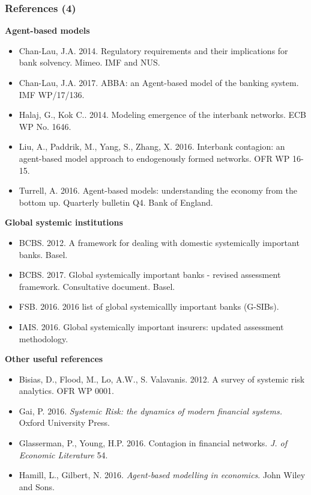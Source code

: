 \documentclass[aspectratio=43,dvipsnames,usenames, svgnames]{beamer}
\begin{document}
\begin{frame} %
\frametitle{References (4)}
\scriptsize{\textbf{Agent-based models}}
\tiny{
\begin{itemize}
	\item Chan-Lau, J.A. 2014. Regulatory requirements and their implications for bank solvency. Mimeo. IMF and NUS.
	\item Chan-Lau, J.A. 2017. ABBA: an Agent-based model of the banking system. IMF WP/17/136.
	\item Halaj, G., Kok C.. 2014. Modeling emergence of the interbank networks. ECB WP No. 1646.
	\item Liu, A., Paddrik, M., Yang, S., Zhang, X. 2016. Interbank contagion: an agent-based model approach to endogenously formed networks. OFR WP 16-15.
	\item Turrell, A. 2016. Agent-based models: understanding the economy from the bottom up. Quarterly bulletin Q4. Bank of England. 
\end{itemize}
}
\vspace{1ex}
\scriptsize{\textbf{Global systemic institutions}}
\tiny{
\begin{itemize}
\item BCBS. 2012. A framework for dealing with domestic systemically important banks. Basel.
\item BCBS. 2017. Global systemically important banks - revised assessment framework. Consultative document. Basel.
\item FSB. 2016. 2016 list of global systemicallly important banks (G-SIBs).
\item IAIS. 2016. Global systemically important insurers: updated assessment methodology. 
\end{itemize}
}
\vspace{1ex}
\scriptsize{\textbf{Other useful references}}
\tiny{
\begin{itemize}
	\item Bisias, D., Flood, M., Lo, A.W., S. Valavanis. 2012. A survey of systemic risk analytics. OFR WP 0001.
	\item Gai, P. 2016. \textit{Systemic Risk: the dynamics of modern financial systems.} Oxford University Press.
	\item Glasserman, P., Young, H.P. 2016. Contagion in financial networks. \textit{J. of Economic Literature} 54.
	\item Hamill, L., Gilbert, N. 2016. \textit{Agent-based modelling in economics}. John Wiley and Sons.
\end{itemize}
}
\end{frame}
\end{document}
